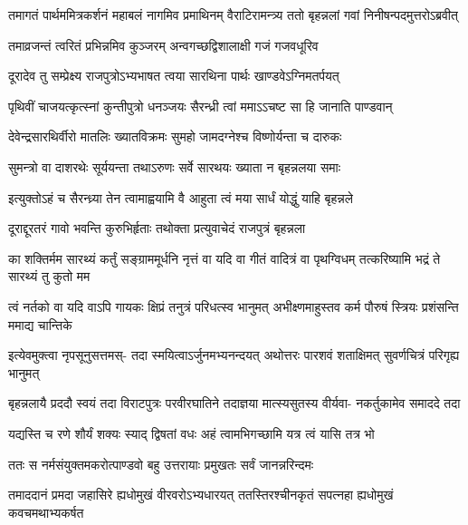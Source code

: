 \fourlineindentedshloka
{तमागतं पार्थममित्रकर्शनं}
{महाबलं नागमिव प्रमाथिनम्}
{वैराटिरामन्त्र्य ततो बृहन्नलां}
{गवां निनीषन्पदमुत्तरोऽब्रवीत्}


\twolineshloka
{तमाव्रजन्तं त्वरितं प्रभिन्नमिव कुञ्जरम्}
{अन्वगच्छद्विशालाक्षी गजं गजवधूरिव}


\twolineshloka
{दूरादेव तु सम्प्रेक्ष्य राजपुत्रोऽभ्यभाषत}
{त्वया सारथिना पार्थः खाण्डवेऽग्निमतर्पयत्}


\twolineshloka
{पृथिवीं चाजयत्कृत्स्नां कुन्तीपुत्रो धनञ्जयः}
{सैरन्ध्री त्वां ममाऽऽचष्ट सा हि जानाति पाण्डवान्}


\twolineshloka
{देवेन्द्रसारथिर्वीरो मातलिः ख्यातविक्रमः}
{सुमहो जामदग्नेश्च विष्णोर्यन्ता च दारुकः}


\twolineshloka
{सुमन्त्रो वा दाशरथेः सूर्ययन्ता तथाऽरुणः}
{सर्वे सारथयः ख्याता न बृहन्नलया समाः}


\twolineshloka
{इत्युक्तोऽहं च सैरन्ध्र्या तेन त्वामाह्वयामि वै}
{आहुता त्वं मया सार्धं योद्धुं याहि बृहन्नले}


\twolineshloka
{दूराद्दूरतरं गावो भवन्ति कुरुभिर्हृताः}
{तथोक्ता प्रत्युवाचेदं राजपुत्रं बृहन्नला}


\threelineshloka
{का शक्तिर्मम सारथ्यं कर्तुं सङ्ग्राममूर्धनि}
{नृत्तं वा यदि वा गीतं वादित्रं वा पृथग्विधम्}
{तत्करिष्यामि भद्रं ते सारथ्यं तु कुतो मम}




\fourlineindentedshloka
{त्वं नर्तको वा यदि वाऽपि गायकः}
{क्षिप्रं तनुत्रं परिधत्स्व भानुमत्}
{अभीक्ष्णमाहुस्तव कर्म पौरुषं}
{स्त्रियः प्रशंसन्ति ममाद्य चान्तिके}



\fourlineindentedshloka
{इत्येवमुक्त्वा नृपसूनुसत्तमस्-}
{तदा स्मयित्वाऽर्जुनमभ्यनन्दयत्}
{अथोत्तरः पारशवं शताक्षिमत्}
{सुवर्णचित्रं परिगृह्य भानुमत्}


\fourlineindentedshloka
{बृहन्नलायै प्रददौ स्वयं तदा}
{विराटपुत्रः परवीरघातिने}
{तदाज्ञया मात्स्यसुतस्य वीर्यवा-}
{नकर्तुकामेव समाददे तदा}




\twolineshloka
{यद्यस्ति च रणे शौर्यं शक्यः स्याद् द्विषतां वधः}
{अहं त्वामभिगच्छामि यत्र त्वं यासि तत्र भो}



\twolineshloka
{ततः स नर्मसंयुक्तमकरोत्पाण्डवो बहु}
{उत्तरायाः प्रमुखतः सर्वं जानन्नरिन्दमः}


\fourlineindentedshloka
{तमाददानं प्रमदा जहासिरे}
{ह्यधोमुखं वीरवरोऽभ्यधारयत्}
{ततस्तिरश्चीनकृतं सपत्नहा}
{ह्यधोमुखं कवचमथाभ्यकर्षत}



